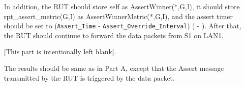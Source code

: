\documentclass[11pt]{report}
\begin{document}
\begin{itemize}
  In addition, the RUT should store self as AssertWinner(*,G,I), it should
  store rpt\_assert\_metric(G,I) as AssertWinnerMetric(*,G,I), and the assert
  timer should be set to \newline
  (\verb=Assert_Time= - \verb=Assert_Override_Interval=)
  ({\PimsmAssertTime} - {\PimsmAssertOverrideInterval}).
  After that, the RUT should continue to forward the data packets from S1 on
  LAN1.

\end{itemize}


[This part is intentionally left blank].


The results should be same as in Part A, except that the Assert message
transmitted by the RUT is triggered by the data packet.

\end{document}
